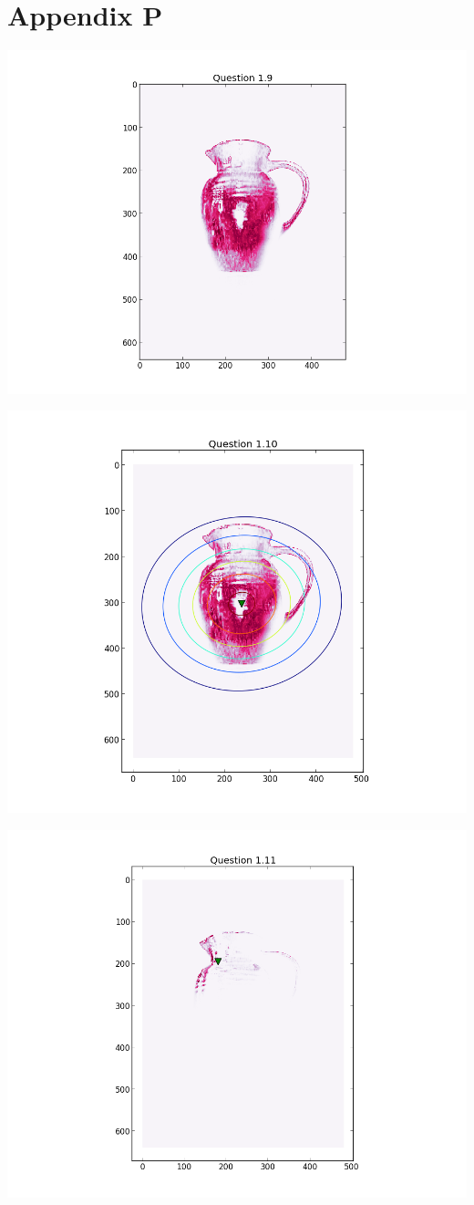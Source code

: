 \documentclass[11pt,a4paper]{article}
\begin{document}
\section*{Appendix P}
\includegraphics[width=1.1\textwidth]{figure_7_pink.png}

\includegraphics[width=1.1\textwidth]{figure_8_pink.png}

\includegraphics[width=1.1\textwidth]{figure_9_pink.png}
\end{document}
